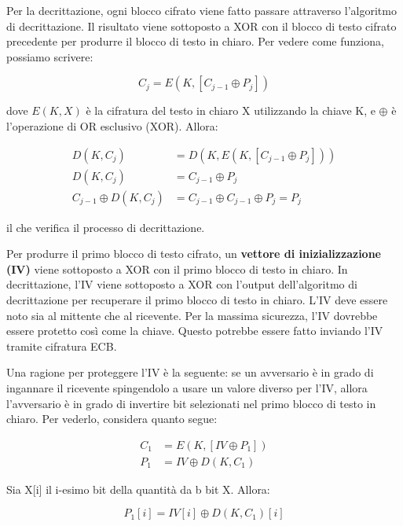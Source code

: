 \documentclass{article}
\begin{document}
\vspace{0.5cm}

Per la decrittazione, ogni blocco cifrato viene fatto passare attraverso l'algoritmo di decrittazione. Il risultato viene sottoposto a XOR con il blocco di testo cifrato precedente per produrre il blocco di testo in chiaro. Per vedere come funziona, possiamo scrivere:

\begin{equation*}
    C_j = E(K, [C_{j-1} \oplus P_j])
\end{equation*}

\noindent dove $E(K,X)$ è la cifratura del testo in chiaro X utilizzando la chiave K, e $\oplus$ è l'operazione di OR esclusivo (XOR). Allora:

\begin{align*}
    D(K, C_j) &= D(K, E(K, [C_{j-1} \oplus P_j])) \\
    D(K, C_j) &= C_{j-1} \oplus P_j \\
    C_{j-1} \oplus D(K, C_j) &= C_{j-1} \oplus C_{j-1} \oplus P_j = P_j
\end{align*}

\noindent il che verifica il processo di decrittazione.

Per produrre il primo blocco di testo cifrato, un \textbf{vettore di inizializzazione (IV)} viene sottoposto a XOR con il primo blocco di testo in chiaro. In decrittazione, l'IV viene sottoposto a XOR con l'output dell'algoritmo di decrittazione per recuperare il primo blocco di testo in chiaro. L'IV deve essere noto sia al mittente che al ricevente. Per la massima sicurezza, l'IV dovrebbe essere protetto così come la chiave. Questo potrebbe essere fatto inviando l'IV tramite cifratura ECB.

Una ragione per proteggere l'IV è la seguente: se un avversario è in grado di ingannare il ricevente spingendolo a usare un valore diverso per l'IV, allora l'avversario è in grado di invertire bit selezionati nel primo blocco di testo in chiaro. Per vederlo, considera quanto segue:

\begin{align*}
    C_1 &= E(K, [IV \oplus P_1]) \\
    P_1 &= IV \oplus D(K, C_1)
\end{align*}

\noindent Sia X[i] il i-esimo bit della quantità da b bit X. Allora:

\begin{equation*}
    P_1[i] = IV[i] \oplus D(K, C_1)[i]
\end{equation*}
\end{document}
